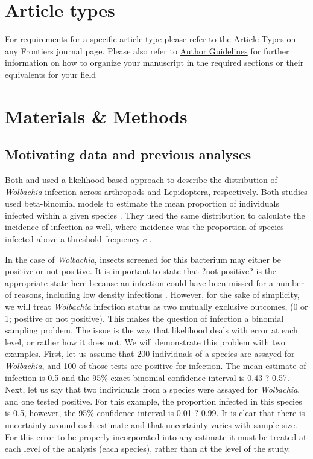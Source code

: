 \documentclass{frontiersSCNS} %
\begin{document}
\section{Article types}

For requirements for a specific article type please refer to the Article Types on any Frontiers journal page. Please also refer to  \href{http://home.frontiersin.org/about/author-guidelines#Sections}{Author Guidelines} for further information on how to organize your manuscript in the required sections or their equivalents for your field


\section{Materials \& Methods}
\subsection{Motivating data and previous analyses}

 Both \cite{Weinert:2015aa} and \cite{Ahmed:2015aa} used a likelihood-based approach to describe the distribution of \emph{Wolbachia} infection across arthropods and Lepidoptera, respectively. Both studies used beta-binomial models to estimate the mean proportion of individuals infected within a given species \citep{Hilgenboecker:2008aa}. They used the same distribution to calculate the incidence of infection as well, where incidence was the proportion of species infected above a threshold frequency $c$  \citep[i.e.,, one infection in 1000 individuals, or 0.001;][]{Weinert:2015aa}. 

In the case of \textit{Wolbachia}, insects screened for this bacterium may either be positive or not positive. It is important to state that ?not positive? is the appropriate state here because an infection could have been missed for a number of reasons, including low density infections \citep{Schneider:2014jv}. However, for the sake of simplicity, we will treat \textit{Wolbachia} infection status as two mutually exclusive outcomes, (0 or 1; positive or not positive). This makes the question of infection a binomial sampling problem. The issue is the way that likelihood deals with error at each level, or rather how it does not. We will demonstrate this problem with two examples. First, let us assume that 200 individuals of a species are assayed for \textit{Wolbachia}, and 100 of those tests are positive for infection. The mean estimate of infection is 0.5 and the 95\% exact binomial confidence interval is 0.43 ? 0.57. Next, let us say that two individuals from a species were assayed for \textit{Wolbachia}, and one tested positive. For this example, the proportion infected in this species is 0.5, however, the 95\% confidence interval is 0.01 ? 0.99. It is clear that there is uncertainty around each estimate and that uncertainty varies with sample size. For this error to be properly incorporated into any estimate it must be treated at each level of the analysis (each species), rather than at the level of the study. 
\end{document}

